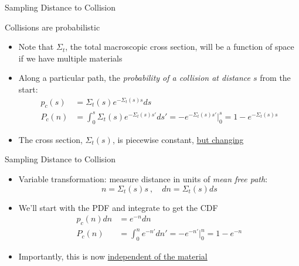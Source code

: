 \documentclass[xcolor=x11names,compress]{beamer}
\renewcommand{\(}{\begin{columns}}
\renewcommand{\)}{\end{columns}}
\newcommand{\<}[1]{\begin{column}{#1}}
\renewcommand{\>}{\end{column}}
\begin{document}
\begin{frame}{Sampling Distance to Collision}

Collisions are probabilistic
\begin{itemize}
  \item Note that $\Sigma_t$, the total macroscopic cross section, will be a function of space if we have multiple materials
  \item Along a particular path, the \textit{probability of a collision at distance $s$} from the start:
    \begin{align*}
    p_c(s) &= \Sigma_t(s) e^{-\Sigma_t(s) s} ds \\
    P_c(n) &= \int_0^s \Sigma_t(s) e^{-\Sigma_t(s) s'}ds' = -e^{-\Sigma_t(s) s'} |_0^s = 1 - e^{-\Sigma_t(s) s}
  \end{align*}
  \item The cross section, $\Sigma_t(s)$, is piecewise constant, \underline{but changing}
\end{itemize}

\end{frame}


\begin{frame}{Sampling Distance to Collision}

\begin{itemize}
  \item Variable transformation: measure distance in units of \textit{mean free path}:
  \[n = \Sigma_t(s)s\:,\quad dn = \Sigma_t(s)ds\]
  \item We'll start with the PDF and integrate to get the CDF
 \begin{align*}
    p_c(n)dn &= e^{-n} dn\\
    P_c(n) &= \int_0^n e^{-n'}dn' = -e^{-n'} |_0^n = 1 - e^{-n}
  \end{align*}
  \item Importantly, this is now \underline{independent of the material}
\end{itemize} 

\end{frame}
\end{document}
